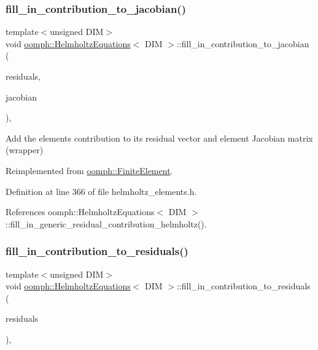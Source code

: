 \subsubsection{\texorpdfstring{fill\+\_\+in\+\_\+contribution\+\_\+to\+\_\+jacobian()}{fill\_in\_contribution\_to\_jacobian()}}
{\footnotesize\ttfamily template$<$unsigned D\+IM$>$ \\
void \hyperlink{classoomph_1_1HelmholtzEquations}{oomph\+::\+Helmholtz\+Equations}$<$ D\+IM $>$\+::fill\+\_\+in\+\_\+contribution\+\_\+to\+\_\+jacobian (\begin{DoxyParamCaption}\item[{\hyperlink{classoomph_1_1Vector}{Vector}$<$ double $>$ \&}]{residuals,  }\item[{\hyperlink{classoomph_1_1DenseMatrix}{Dense\+Matrix}$<$ double $>$ \&}]{jacobian }\end{DoxyParamCaption})\hspace{0.3cm}{\ttfamily [inline]}, {\ttfamily [virtual]}}



Add the element\textquotesingle{}s contribution to its residual vector and element Jacobian matrix (wrapper) 



Reimplemented from \hyperlink{classoomph_1_1FiniteElement_a0ae7af222af38a0d53bf283dc85bdfea}{oomph\+::\+Finite\+Element}.



Definition at line 366 of file helmholtz\+\_\+elements.\+h.



References oomph\+::\+Helmholtz\+Equations$<$ D\+I\+M $>$\+::fill\+\_\+in\+\_\+generic\+\_\+residual\+\_\+contribution\+\_\+helmholtz().

\mbox{\label{classoomph_1_1HelmholtzEquations_a78f38997ee311a4cd710f0f595de1f3c}} 
\subsubsection{\texorpdfstring{fill\+\_\+in\+\_\+contribution\+\_\+to\+\_\+residuals()}{fill\_in\_contribution\_to\_residuals()}}
{\footnotesize\ttfamily template$<$unsigned D\+IM$>$ \\
void \hyperlink{classoomph_1_1HelmholtzEquations}{oomph\+::\+Helmholtz\+Equations}$<$ D\+IM $>$\+::fill\+\_\+in\+\_\+contribution\+\_\+to\+\_\+residuals (\begin{DoxyParamCaption}\item[{\hyperlink{classoomph_1_1Vector}{Vector}$<$ double $>$ \&}]{residuals }\end{DoxyParamCaption})\hspace{0.3cm}{\ttfamily [inline]}, {\ttfamily [virtual]}}



